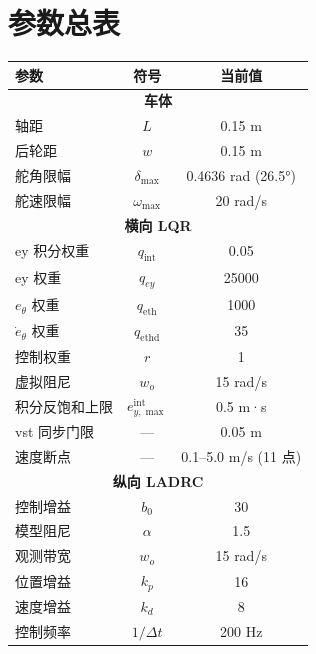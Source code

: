 \documentclass[11pt,a4paper]{article}
\begin{document}
\section{参数总表}

\begin{center}
\begin{tabular}{l|c|c}
\toprule
参数 & 符号 & 当前值 \\
\midrule
\multicolumn{3}{c}{\textbf{车体}} \\
轴距 & $L$ & 0.15 m \\
后轮距 & $w$ & 0.15 m \\
舵角限幅 & $\delta_{\max}$ & 0.4636 rad (26.5°) \\
舵速限幅 & $\omega_{\max}$ & 20 rad/s \\
\midrule
\multicolumn{3}{c}{\textbf{横向 LQR}} \\
ey 积分权重 & $q_{\text{int}}$ & 0.05 \\
ey 权重 & $q_{ey}$ & 25000 \\
$e_\theta$ 权重 & $q_{\text{eth}}$ & 1000 \\
$\dot{e}_\theta$ 权重 & $q_{\text{ethd}}$ & 35 \\
控制权重 & $r$ & 1 \\
虚拟阻尼 & $w_o$ & 15 rad/s \\
积分反饱和上限 & $e_{y,\max}^{\text{int}}$ & 0.5 m·s \\
vst 同步门限 & --- & 0.05 m \\
速度断点 & --- & 0.1--5.0 m/s (11 点) \\
\midrule
\multicolumn{3}{c}{\textbf{纵向 LADRC}} \\
控制增益 & $b_0$ & 30 \\
模型阻尼 & $\alpha$ & 1.5 \\
观测带宽 & $w_o$ & 15 rad/s \\
位置增益 & $k_p$ & 16 \\
速度增益 & $k_d$ & 8 \\
控制频率 & $1/\Delta t$ & 200 Hz \\
\bottomrule
\end{tabular}
\end{center}
\end{document}
